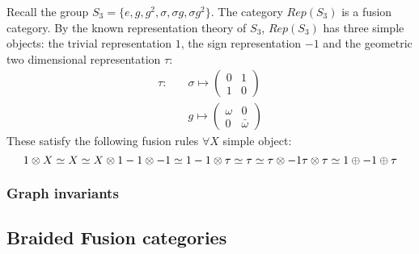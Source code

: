 \documentclass{article}
\newenvironment{example}[1][Example]{\begin{trivlist}
\item[\hskip \labelsep {\bfseries #1}]}{\end{trivlist}}
\begin{document}
\begin{example}
Recall the group $S_3=\{e, g, g^2, \sigma, \sigma g, \sigma g^2 \}$. The category $Rep(S_3)$ is a fusion category. By the known representation theory of $S_3$, $Rep(S_3)$ has three simple objects: the trivial representation $1$, the sign representation $-1$ and the geometric two dimensional representation $\tau$:
\begin{equation*}
\begin{split}
    \tau : \quad & \sigma \mapsto \left( {\begin{array}{cc} 0 & 1 \\ 1 & 0 \end{array}}\right) \\
     & g \mapsto \left( {\begin{array}{cc} \omega & 0 \\ 0 & \bar{\omega} \end{array}}\right)
\end{split}
\end{equation*}
These satisfy the following fusion rules $\forall X$ simple object:
\begin{equation}
        1 \otimes X \simeq X \simeq X \otimes 1\\
        -1 \otimes -1 \simeq 1\\
        -1 \otimes \tau \simeq \tau \simeq \tau \otimes -1\\
        \tau \otimes \tau \simeq 1 \oplus -1 \oplus \tau\\
\end{equation}

\end{example}

\subsubsection{Graph invariants}

\subsection{Braided Fusion categories}
\end{document}
